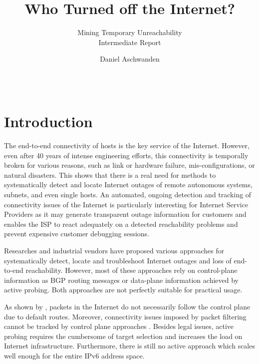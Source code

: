 \documentclass{sigcomm-alternate}
\begin{document}
 
\title{Who Turned off the Internet?} 
\subtitle{Mining Temporary Unreachability\\ \Large Intermediate Report }

\author{ \alignauthor Daniel Aschwanden\\
\\
\\
}

\maketitle 
\section{Introduction}
The end-to-end connectivity of hosts is the key service of the Internet. However, even after 40 years of intense engineering efforts, this connectivity is temporally broken for various reasons, such as link or hardware failure, mis-configurations, or natural disasters. 
This shows that there is a real need for methods to systematically detect and locate Internet outages of remote autonomous systems, subnets, and even single hosts. An automated, ongoing detection and tracking of connectivity issues of the Internet is particularly interesting for Internet Service Providers as it may generate transparent outage information for customers and enables the ISP to react adequately on a detected reachability problems and prevent expensive customer debugging sessions.

Researches and industrial vendors have proposed various approaches for systematically detect, locate and troubleshoot Internet outages and loss of end-to-end reachability. %
However, most of these approaches rely on control-plane information as BGP routing messages or data-plane information achieved by active probing. Both approaches are not perfectly suitable for practical usage.

As shown by \cite{Bush:Optometry}, packets in the Internet do not necessarily follow the control plane due to default routes. Moreover, connectivity issues imposed by packet filtering cannot be tracked by control plane approaches \cite{Dainotti:2011:ACI}. Besides legal issues, active probing requires the cumbersome of target selection and increases the load on Internet infrastructure. Furthermore, there is still no active approach which scales well enough for the entire IPv6 address space.
\end{document}
